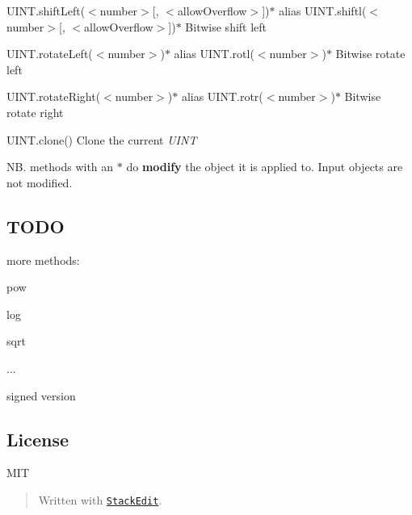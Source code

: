 \begin{DoxyItemize}
\item {\ttfamily U\+I\+N\+T.\+shift\+Left($<$number$>$\mbox{[}, $<$allow\+Overflow$>$\mbox{]})$\ast$} alias {\ttfamily U\+I\+N\+T.\+shiftl($<$number$>$\mbox{[}, $<$allow\+Overflow$>$\mbox{]})$\ast$} Bitwise shift left
\item {\ttfamily U\+I\+N\+T.\+rotate\+Left($<$number$>$)$\ast$} alias {\ttfamily U\+I\+N\+T.\+rotl($<$number$>$)$\ast$} Bitwise rotate left
\item {\ttfamily U\+I\+N\+T.\+rotate\+Right($<$number$>$)$\ast$} alias {\ttfamily U\+I\+N\+T.\+rotr($<$number$>$)$\ast$} Bitwise rotate right
\item {\ttfamily U\+I\+N\+T.\+clone()} Clone the current {\itshape U\+I\+NT}
\end{DoxyItemize}

NB. methods with an $\ast$ do {\bfseries modify} the object it is applied to. Input objects are not modified.

\subsection*{T\+O\+DO}


\begin{DoxyItemize}
\item more methods\+:
\begin{DoxyItemize}
\item pow
\item log
\item sqrt
\item ...
\end{DoxyItemize}
\item signed version
\end{DoxyItemize}

\subsection*{License}

M\+IT

\begin{quote}
Written with \href{https://stackedit.io/}{\tt Stack\+Edit}.\end{quote}
